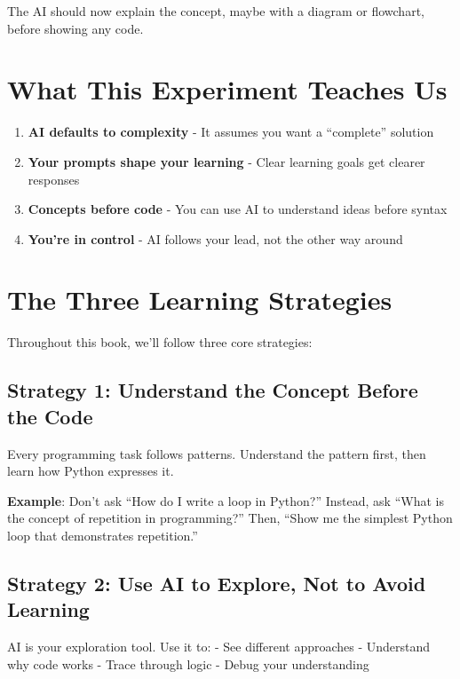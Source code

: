 \documentclass[
  letterpaper,
  DIV=11,
  numbers=noendperiod,
  oneside]{scrreprt}
\providecommand{\tightlist}{%
  \setlength{\itemsep}{0pt}\setlength{\parskip}{0pt}}\usepackage{longtable,booktabs,array}
\begin{document}
The AI should now explain the concept, maybe with a diagram or
flowchart, before showing any code.

\section{What This Experiment Teaches
Us}\label{what-this-experiment-teaches-us}

\begin{enumerate}
\def\labelenumi{\arabic{enumi}.}
\tightlist
\item
  \textbf{AI defaults to complexity} - It assumes you want a
  ``complete'' solution
\item
  \textbf{Your prompts shape your learning} - Clear learning goals get
  clearer responses
\item
  \textbf{Concepts before code} - You can use AI to understand ideas
  before syntax
\item
  \textbf{You're in control} - AI follows your lead, not the other way
  around
\end{enumerate}

\section{The Three Learning
Strategies}\label{the-three-learning-strategies}

Throughout this book, we'll follow three core strategies:

\subsection{Strategy 1: Understand the Concept Before the
Code}\label{strategy-1-understand-the-concept-before-the-code}

Every programming task follows patterns. Understand the pattern first,
then learn how Python expresses it.

\textbf{Example}: Don't ask ``How do I write a loop in Python?''
Instead, ask ``What is the concept of repetition in programming?'' Then,
``Show me the simplest Python loop that demonstrates repetition.''

\subsection{Strategy 2: Use AI to Explore, Not to Avoid
Learning}\label{strategy-2-use-ai-to-explore-not-to-avoid-learning}

AI is your exploration tool. Use it to: - See different approaches -
Understand why code works - Trace through logic - Debug your
understanding
\end{document}
